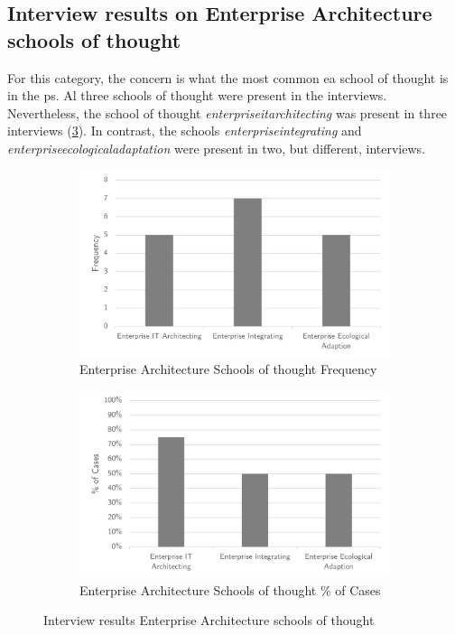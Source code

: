 \subsection{Interview results on Enterprise Architecture schools of thought}
\label{sub:interviewresultseaschools}
For this category, the concern is what the most common \acrlong{ea} school of thought is in the \gls{ps}. Al three schools of thought were present in the interviews. Nevertheless, the school of thought \textit{\gls{enterpriseitarchitecting}} was present in three interviews (\cref{fig:intervieweaschoolsantifragile}). In contrast, the schools \textit{\gls{enterpriseintegrating}} and \textit{\gls{enterpriseecologicaladaptation}} were present in two, but different, interviews.
\begin{figure}[H]
	\centering
	\begin{subfigure}[H]{0.5\textwidth}
		\centering
		\includegraphics[width=0.95\linewidth]{images/easchools_frequency}
		\caption{Enterprise Architecture Schools of thought Frequency}
		\label{fig:easchoolsfrequency}
	\end{subfigure}%
	\begin{subfigure}[H]{0.5\textwidth}
		\centering
		\includegraphics[width=0.95\linewidth]{images/easchools_cases}
		\caption{Enterprise Architecture Schools of thought \% of Cases}
		\label{fig:easchoolscases}
	\end{subfigure}
	\caption{Interview results Enterprise Architecture schools of thought}
	\label{fig:intervieweaschoolsantifragile}
\end{figure}
